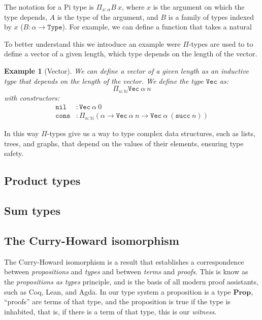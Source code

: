 \documentclass[
  a4paper, 
  10pt, 
  parskip=half, 
  DIV=20,
  toc=bibliography,
  usegeometry,
]{scrartcl}
\newtheorem{example}[theorem]{Example}
\newcommand{\Prop}{\mathbf{Prop}}
\begin{document}
The notation for a Pi type is \(\Pi_{x: \alpha} B \ x\), where \(x\) is the argument
on which the type depends, \(A\) is the type of the argument, and \(B\) is a family
of types indexed by \(x\) (\(B: \alpha \to \texttt{Type}\)). For example, we can
define a function that takes a natural

To better understand this we introduce an example were \(\Pi\)-types are used to
to define a vector of a given length, which type depends on the length of the
vector.

\begin{example}[Vector]
  We can define a vector of a given length as an inductive type that depends on
  the length of the vector. We define the type \(\texttt{Vec}\) as:
\[
 \Pi_{n: \mathbb{N}} \texttt{Vec} \ \alpha \ n
\]
with constructors:
\begin{align*}
  \texttt{nil} & : \texttt{Vec} \ \alpha \ 0 \\
  \texttt{cons} & : \Pi_{n: \mathbb{N}}
  (\alpha \to \texttt{Vec} \ \alpha \ n
    \to \texttt{Vec} \ \alpha \ (\texttt{succ} \ n)) 
\end{align*}
\end{example}
In this way \(\Pi\)-types give us a way to type complex data structures, such as
lists, trees, and graphs, that depend on the values of their elements,
ensuring type safety.

\subsection{Product types}

\subsection{Sum types}

\subsection{The Curry-Howard isomorphism}\label{sec:curry_howard}

The Curry-Howard isomorphism is a result that establishes a correspondence
between \emph{propositions} and \emph{types} and between \emph{terms} and \emph{proofs}.
This is know as the \emph{propositions as types} principle, and is the basis of
all modern proof assistants, such as Coq, Lean, and Agda. In our type system
a proposition is a type \(\Prop\), \enquote{proofs} are terms of that type,
and the proposition is true if the type is inhabited, that is, if there is a
term of that type, this is our \emph{witness}.
\end{document}
